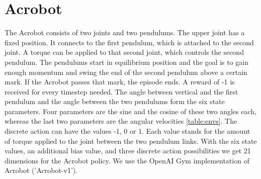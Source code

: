 
\section{Acrobot}



The Acrobot consists of two joints and two pendulums. The upper joint has a fixed position. It connects to the first pendulum, which is attached to the second joint. A torque can be applied to that second joint, which controls the second pendulum. The pendulums start in equilibrium position and the goal is to gain enough momentum and swing the end of the second pendulum above a certain mark. If the Acrobot passes that mark, the episode ends. A reward of -1 is received for every timestep needed. The angle between vertical and the first pendulum and the angle between the two pendulums form the six state parameters. Four parameters are the sine and the cosine of these two angles each, whereas the last two parameters are the angular velocities \ref{table:envs}. The discrete action can have the values -1, 0 or 1. Each value stands for the amount of torque applied to the joint between the two pendulum links. With the six state values, an additional bias value, and three discrete action possibilities we get 21 dimensions for the Acrobot policy. We use the OpenAI Gym implementation of Acrobot ('Acrobot-v1').

